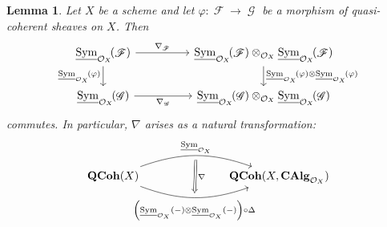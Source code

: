 \documentclass{amsart}
\newtheorem{lemma}[equation]{Lemma}
\theoremstyle{definition}
\DeclareMathOperator{\Fscr}{\mathscr{F}}
\DeclareMathOperator{\Gscr}{\mathscr{G}}
\DeclareMathOperator{\Ocal}{\mathcal{O}}
\DeclareMathOperator{\sym}{Sym}
\newcommand{\CAlg}[1]{\mathbf{CAlg}_{#1}}
\newcommand{\RelSym}[1]{\underline{\sym}_{{#1}}}
\DeclareMathOperator{\QCoh}{\mathbf{QCoh}}
\numberwithin{equation}{subsection}
\begin{document}
\begin{lemma}\label{Lemma: Section Background Scheme: Nabla as a natural comultiplication}
Let $X$ be a scheme and let $\varphi:\Fscr \to \Gscr$ be a morphism of quasi-coherent sheaves on $X$. Then
\[
\begin{tikzcd}
\RelSym{\Ocal_X}\!(\Fscr) \ar[d, swap]{}{\RelSym{\Ocal_X}\!(\varphi)} \ar[rr]{}{\nabla_{\Fscr}} & & \RelSym{\Ocal_X}\!(\Fscr) \otimes_{\Ocal_X} \RelSym{\Ocal_X}\!(\Fscr) \ar[d]{}{\RelSym{\Ocal_X}\!(\varphi) \otimes \RelSym{\Ocal_X}\!(\varphi)} \\
\RelSym{\Ocal_X}\!(\Gscr) \ar[rr, swap]{}{\nabla_{\Gscr}} & & \RelSym{\Ocal_X}\!(\Gscr) \otimes_{\Ocal_X} \RelSym{\Ocal_X}\!(\Gscr)
\end{tikzcd}
\]
commutes. In particular, $\nabla$ arises as a natural transformation:
\[
\begin{tikzcd}
	\QCoh(X) \ar[rrr, bend left = 20, ""{name = U}]{}{\RelSym{\Ocal_X}} \ar[rrr, swap, bend right = 20, ""{name = D}]{}{\left(\RelSym{\Ocal_X}(-) \otimes \RelSym{\Ocal_X}(-)\right) \circ \Delta} & & & \QCoh(X,\CAlg{\Ocal_X})
	\ar[from = U, to = D, Rightarrow, shorten <= 4pt, shorten >= 4pt]{}{\nabla}
\end{tikzcd}
\]
\end{lemma}
\end{document}
